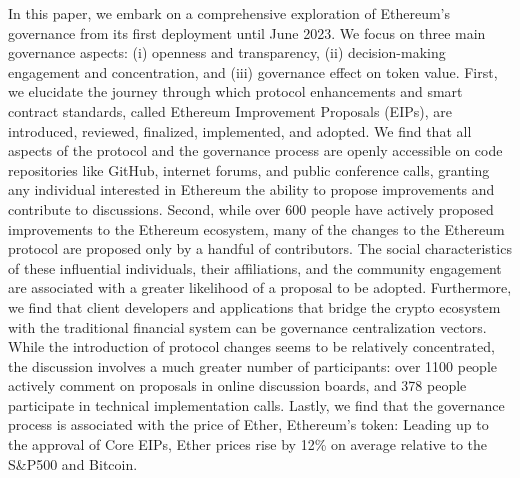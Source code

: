 \documentclass[No]{AEA}
\begin{document}
In this paper, we embark on a comprehensive exploration of Ethereum's governance from its first deployment until June 2023. We focus on three main governance aspects: (i) openness and transparency, (ii) decision-making engagement and concentration, and (iii) governance effect on token value. First, we elucidate the journey through which protocol enhancements and smart contract standards, called Ethereum Improvement Proposals (EIPs), are introduced, reviewed, finalized, implemented, and adopted. We find that all aspects of the protocol and the governance process are openly accessible on code repositories like GitHub, internet forums, and public conference calls, granting any individual interested in Ethereum the ability to propose improvements and contribute to discussions. Second, while over 600 people have actively proposed improvements to the Ethereum ecosystem, many of the changes to the Ethereum protocol are proposed only by a handful of contributors. The social characteristics of these influential individuals, their affiliations, and the community engagement are associated with a greater likelihood of a proposal to be adopted. Furthermore, we find that client developers and applications that bridge the crypto ecosystem with the traditional financial system can be governance centralization vectors. While the introduction of protocol changes seems to be relatively concentrated, the discussion involves a much greater number of participants: over 1100 people actively comment on proposals in online discussion boards, and 378 people participate in technical implementation calls. Lastly, we find that the governance process is associated with the price of Ether, Ethereum's token: Leading up to the approval of Core EIPs, Ether prices rise by 12\% on average relative to the S\&P500 and Bitcoin. 
\end{document}

